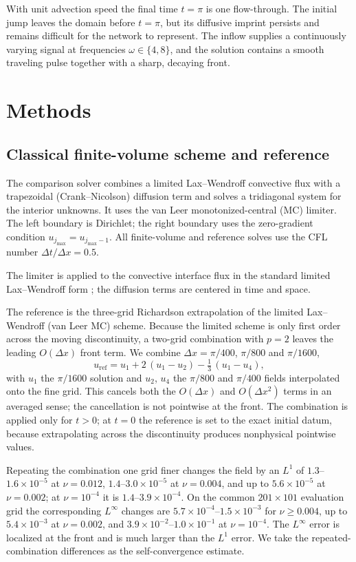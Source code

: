 \documentclass[11pt]{article}
\begin{document}
With unit advection speed the final time $t=\pi$ is one flow-through. The
initial jump leaves the domain before $t=\pi$, but its diffusive imprint
persists and remains difficult for the network to represent. The inflow
supplies a continuously varying signal at frequencies $\omega\in\{4,8\}$, and
the solution contains a smooth traveling pulse together with a sharp, decaying
front.

\section{Methods}
\label{sec:methods}

\subsection{Classical finite-volume scheme and reference}
The comparison solver combines a limited Lax--Wendroff convective flux with a
trapezoidal (Crank--Nicolson) diffusion term and solves a tridiagonal system
for the interior unknowns. It uses the van Leer monotonized-central (MC)
limiter. The left boundary is Dirichlet; the right boundary uses the
zero-gradient condition $u_{j_{\max}} = u_{j_{\max}-1}$. All finite-volume and
reference solves use the CFL number $\Delta t/\Delta x=0.5$.

The limiter is applied to the convective interface flux in the standard
limited Lax--Wendroff form \citep{leveque2002}; the diffusion terms are
centered in time and space.

The reference is the three-grid Richardson extrapolation of the limited
Lax--Wendroff (van Leer MC) scheme. Because the limited scheme is only
first order across the moving discontinuity, a two-grid combination with $p=2$
leaves the leading $O(\Delta x)$ front term. We combine
$\Delta x=\pi/400$, $\pi/800$ and $\pi/1600$,
\begin{equation}
  u_{\mathrm{ref}} = u_1 + 2\,(u_1-u_2) - \tfrac13\,(u_1-u_4),
  \label{eq:rich3}
\end{equation}
with $u_1$ the $\pi/1600$ solution and $u_2$, $u_4$ the $\pi/800$ and $\pi/400$
fields interpolated onto the fine grid. This cancels both the $O(\Delta x)$ and
$O(\Delta x^2)$ terms in an averaged sense; the cancellation is not pointwise
at the front. The combination is applied only for $t>0$; at $t=0$ the reference
is set to the exact initial datum, because extrapolating across the
discontinuity produces nonphysical pointwise values.

Repeating the combination one grid finer changes the field by an $L^1$ of
$1.3$--$1.6\times10^{-5}$ at $\nu=0.012$, $1.4$--$3.0\times10^{-5}$ at
$\nu=0.004$, and up to $5.6\times10^{-5}$ at $\nu=0.002$; at $\nu=10^{-4}$ it
is $1.4$--$3.9\times10^{-4}$. On the common $201\times101$ evaluation grid the
corresponding $L^\infty$ changes are $5.7\times10^{-4}$--$1.5\times10^{-3}$ for
$\nu\ge0.004$, up to $5.4\times10^{-3}$ at $\nu=0.002$, and
$3.9\times10^{-2}$--$1.0\times10^{-1}$ at $\nu=10^{-4}$. The $L^\infty$ error is
localized at the front and is much larger than the $L^1$ error. We take the
repeated-combination differences as the self-convergence estimate.
\end{document}
